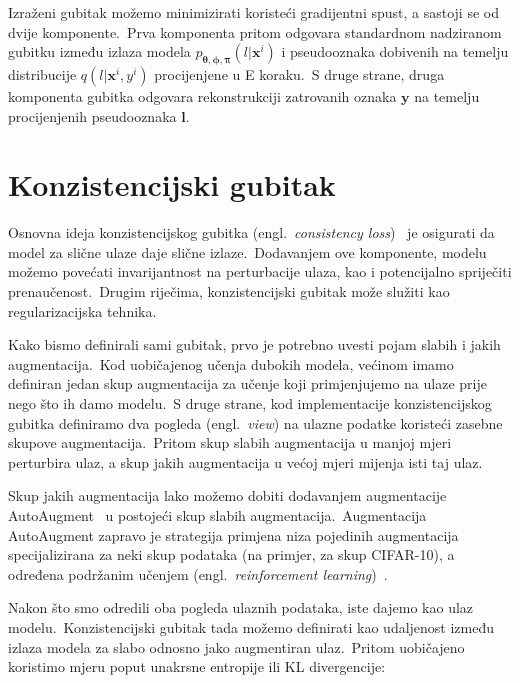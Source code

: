 \documentclass[diplomskirad]{fer}
\begin{document}
Izraženi gubitak možemo minimizirati koristeći gradijentni spust, a sastoji se od dvije komponente.\ 
Prva komponenta pritom odgovara standardnom nadziranom gubitku između izlaza modela $p_{\bm{\theta}, \bm{\phi}, \bm{\pi}}(l | \bm{x}^i)$ i pseudooznaka dobivenih na temelju distribucije $q(l | \bm{x}^i, y^i)$ procijenjene u E koraku.\ 
S druge strane, druga komponenta gubitka odgovara rekonstrukciji zatrovanih oznaka $\bm{y}$ na temelju procijenjenih pseudooznaka $\bm{l}$.\ 

\section{Konzistencijski gubitak}
\label{sek:kon_gubitak}

Osnovna ideja konzistencijskog gubitka (engl.\ \textit{consistency loss})~\cite{berthelot2019mixmatch} je osigurati da model za slične ulaze daje slične izlaze.\ 
Dodavanjem ove komponente, modelu možemo povećati invarijantnost na perturbacije ulaza, kao i potencijalno spriječiti prenaučenost.\ 
Drugim riječima, konzistencijski gubitak može služiti kao regularizacijska tehnika.\ 

Kako bismo definirali sami gubitak, prvo je potrebno uvesti pojam slabih i jakih augmentacija.\ 
Kod uobičajenog učenja dubokih modela, većinom imamo definiran jedan skup augmentacija za učenje koji primjenjujemo na ulaze prije nego što ih damo modelu.\ 
S druge strane, kod implementacije konzistencijskog gubitka definiramo dva pogleda (engl.\ \textit{view}) na ulazne podatke koristeći zasebne skupove augmentacija.\ 
Pritom skup slabih augmentacija u manjoj mjeri perturbira ulaz, a skup jakih augmentacija u većoj mjeri mijenja isti taj ulaz.\ 

Skup jakih augmentacija lako možemo dobiti dodavanjem augmentacije AutoAugment~\cite{cubuk2019autoaugment} u postojeći skup slabih augmentacija.\
Augmentacija AutoAugment zapravo je strategija primjena niza pojedinih augmentacija specijalizirana za neki skup podataka (na primjer, za skup CIFAR-10), a određena podržanim učenjem (engl.\ \textit{reinforcement learning})~\cite{kaelbling1996reinforcement}.\ 

\pagebreak

Nakon što smo odredili oba pogleda ulaznih podataka, iste dajemo kao ulaz modelu.\ Konzistencijski gubitak tada možemo definirati kao udaljenost između izlaza modela za slabo odnosno jako augmentiran ulaz.\ Pritom uobičajeno koristimo mjeru poput unakrsne entropije ili KL divergencije:
\end{document}
